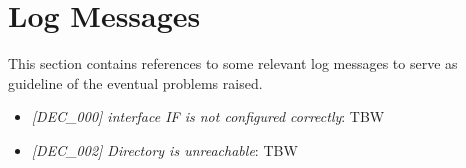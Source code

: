 \documentclass[dec_sum_main.tex]{subfiles}
\begin{document}
\section{Log Messages}
This section contains references to some relevant log messages to serve as guideline of the eventual problems raised. \newline
\par
\noindent
\begin{itemize}
	\item \textit{[DEC\_000] \textit{interface} I\/F is not configured correctly}: TBW
	\item \textit{[DEC\_002] Directory is unreachable}: TBW
\end{itemize}
\end{document}
